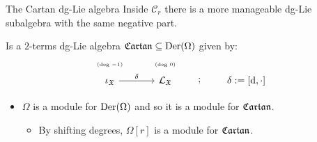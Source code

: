\documentclass[beamer,10pt]{standalone}
\begin{document}
\begin{frame}{The Cartan dg-Lie algebra}
  Inside $\mathcal{C}_r$ there is a more manageable dg-Lie subalgebra with the same negative part.
  \vfill \pause

  \begin{defblock}
  	Is a $2$-terms dg-Lie algebra $\mathfrak{Cartan} \subseteq \mathrm{Der}(\Omega)$ given by:
  \begin{displaymath}
	\begin{tikzcd}[ampersand replacement=\&,row sep = small]
		\text{\tiny (deg $-1$)} \& \text{\tiny (deg $0$)}\&[2em]
		\\[-.7em]
		\iota_{\X} \ar[r,"\delta"] \& \Lie_{\X} \ar[r,phantom,";"] \& \delta:= [\d, \cdot]
	\end{tikzcd}
  \end{displaymath}
  \end{defblock}
  \vfill \pause

  \begin{itemize}
	\item[$\bullet$] $\Omega$ is a module for $\mathrm{Der}(\Omega)$ and so it is a module for $\mathfrak{Cartan}$.
	\begin{itemize}
		\item[$\Rightarrow$] \quad By shifting degrees, $\Omega[r]$ is a module for $\mathfrak{Cartan}$. 
	\end{itemize}
  \end{itemize}
  \vfill 

\end{frame}
\note[itemize]
{
	\item 
	\item 
}
\end{document}
